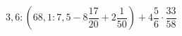 \begin{ex}[type=calculate]
	\begin{condition}
		\( 3,6:\left( 68,1:7,5-8\dfrac{17}{20}+2\dfrac{1}{50} \right)+4\dfrac{5}{6}\cdot\dfrac{33}{58} \)
	\end{condition}
\end{ex}
